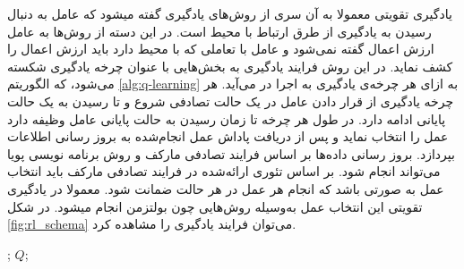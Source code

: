 یادگیری تقویتی معمولا به آن سری از روش‌های یادگیری گفته میشود که عامل به دنبال رسیدن به یادگیری از طرق ارتباط با محیط است. در این دسته از روش‌ها به عامل ارزش اعمال گفته نمی‌شود و عامل با تعاملی که با محیط دارد باید ارزش اعمال را کشف نماید. در این روش فرایند یادگیری به بخش‌هایی با عنوان چرخه یادگیری شکسته می‌شود، که الگوریتم \ref{alg:q-learning} به ازای هر چرخه‌ی یادگیری به اجرا در می‌آید. هر چرخه یادگیری از قرار دادن عامل در یک حالت تصادفی شروع و تا رسیدن به یک حالت پایانی ادامه دارد. در طول هر چرخه تا زمان رسیدن به حالت پایانی عامل وظیفه دارد عمل را انتخاب نماید و پس از دریافت پاداش عمل انجام‌شده به بروز رسانی اطلاعات  بپردازد. بروز رسانی داده‌ها بر اساس فرایند تصادفی مارکف و روش برنامه نویسی پویا می‌تواند انجام شود. بر اساس تئوری ارائه‌شده در فرایند تصادفی مارکف باید انتخاب عمل به صورتی باشد که انجام هر عمل در هر حالت ضمانت شود. معمولا در یادگیری تقویتی این انتخاب عمل به‌وسیله روش‌هایی چون بولتزمن انجام میشود. در شکل \ref{fig:rl_schema} می‌توان فرایند یادگیری را مشاهده کرد.

\begin{algorithm}[t]
\caption{}\label{alg:q-learning}
\begin{latin}
\begin{algorithmic}[1]
;
\EndWhile
\State \Return $Q$;
\EndProcedure
\end{algorithmic}
\end{latin}
\end{algorithm}


